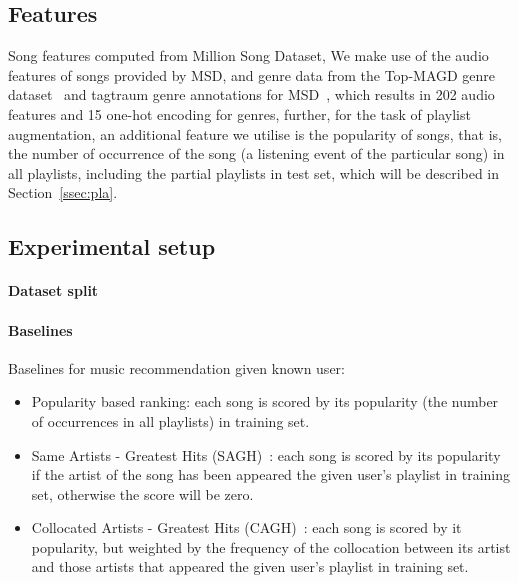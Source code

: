 \subsection{Features}

Song features computed from Million Song Dataset,
We make use of the audio features of songs provided by MSD, 
and genre data from the Top-MAGD genre dataset~\cite{schindler2012facilitating} and tagtraum genre annotations for MSD~\cite{schreiber2015improving},
which results in 202 audio features and 15 one-hot encoding for genres,
further, for the task of playlist augmentation, an additional feature we utilise is the popularity of songs,
that is, the number of occurrence of the song (\ie a listening event of the particular song) in all playlists,
including the partial playlists in test set, which will be described in Section~\ref{ssec:pla}.
%
%



\subsection{Experimental setup}

\paragraph{Dataset split}

\paragraph{Baselines}
Baselines for music recommendation given known user:
\begin{itemize}
\item Popularity based ranking: 
each song is scored by its popularity (the number of occurrences in all playlists) in training set.
%
\item Same Artists - Greatest Hits (SAGH)~\cite{mcfee2012million}: 
each song is scored by its popularity if the artist of the song has been appeared the given user's playlist in training set, 
otherwise the score will be zero.
\item Collocated Artists - Greatest Hits (CAGH)~\cite{bonnin2013evaluating}: 
each song is scored by it popularity, but weighted by the frequency of the collocation between its artist and 
those artists that appeared the given user's playlist in training set.
\end{itemize}


